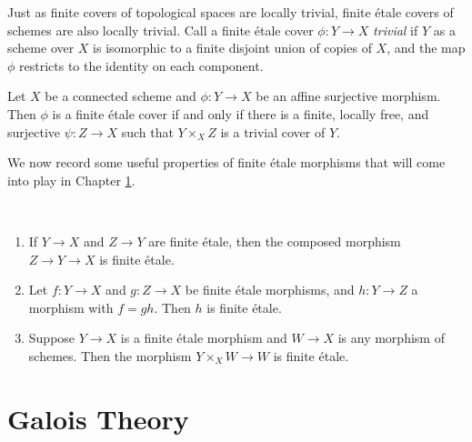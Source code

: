 \documentclass[11pt,openany]{book} %
\begin{document}
Just as finite covers of topological spaces are locally trivial, finite \'etale covers of schemes are also locally trivial. Call a finite \'etale cover $\phi : Y \to X$ \emph{trivial} if $Y$ as a scheme over $X$ is isomorphic to a finite disjoint union of copies of $X$, and the map $\phi$ restricts to the identity on each component.\\

\begin{lemma}
Let $X$ be a connected scheme and $\phi : Y \to X$ be an affine surjective morphism. Then $\phi$ is a finite \'etale cover if and only if there is a finite, locally free, and surjective $\psi : Z \to X$ such that $Y \times_X Z$ is a trivial cover of $Y$.
\end{lemma}
\hfill

We now record some useful properties of finite \'etale morphisms that will come into play in Chapter \ref{galois}.\\

\begin{lemma}\ \label{etalefibre}
\begin{enumerate}[label=$\blacktriangleright$]
	\item If $Y \to X$ and $Z \to Y$ are finite \'etale, then the composed morphism $Z \to Y \to X$ is finite \'etale.
    \item Let $f : Y \to X$ and $g : Z \to X$ be finite \'etale morphisms, and $h : Y \to Z$ a morphism with $f = gh$. Then $h$ is finite \'etale.
	\item Suppose $Y \to X$ is a finite \'etale morphism and $W \to X$ is any morphism of schemes. Then the morphism $Y \times_X W \to W$ is finite \'etale.
\end{enumerate}
\end{lemma}


\chapter{Galois Theory} \label{galois}
\end{document}

